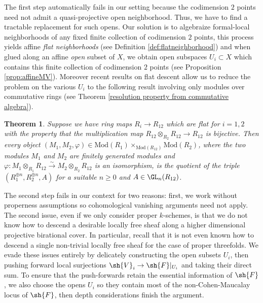 \documentclass[12pt]{amsart}
\newtheorem{maintheorem}{Theorem}
\newcommand{\ra}{\rightarrow}
\begin{document}
The first step automatically fails in our setting because the codimension $2$ points need not admit a quasi-projective open neighborhood. Thus, we have to find a tractable replacement for such opens. Our solution is to algebraize formal-local neighborhoods of any fixed finite collection of codimension $2$ points, this process yields affine \emph{flat neighborhoods} (see Definition \ref{def:flatneighborhood}) and when glued along an affine \emph{open} subset of $X$, we obtain open subspaces $U_i \subset X$ which contains this finite collection of codimension $2$ points (see Proposition \ref{prop:affineMV}). Moreover recent results on flat descent allow us to reduce the problem on the various $U_i$ to the following result involving only modules over commutative rings (see Theorem \ref{resolution property from commutative algebra}). %

\begin{maintheorem}
\label{intro: resolution property from commutative algebra}
Suppose we have ring maps $R_i\ra R_{12}$ which are flat for $i=1,2$ with the property that the multiplication map $R_{12}\otimes_{R_2}R_{12}\ra R_{12}$ is bijective. Then every object $(M_1,M_2,\varphi) \in \mathrm{Mod}(R_1) \times_{\mathrm{Mod}(R_{12})} \mathrm{Mod}(R_2)$, where the two modules $M_1$ and $M_2$ are finitely generated modules and $\varphi:M_1 \otimes_{R_1} R_{12} \xrightarrow{\sim} M_2 \otimes_{R_2} R_{12}$ is an isomorphism, is the quotient of the triple $(R_1^{\oplus n}, R_2^{\oplus n}, A)$ for a suitable $n\geq 0$ and $A\in \GL_n(R_{12})$.
\end{maintheorem} 

The second step fails in our context for two reasons: first, we work without properness assumptions so cohomological vanishing arguments need not apply. The second issue, even if we only consider proper $k$-schemes, is that we do not know how to descend a desirable locally free sheaf along a higher dimensional projective birational cover. In particular, recall that it is not even known how to descend a single non-trivial locally free sheaf for the case of proper threefolds. We evade these issues entirely by delicately constructing the open subsets $U_i$, then pushing forward local surjections $\sh{V}_i \to \sh{F}|_{U_i}$ and taking their direct sum. To ensure that the push-forwards retain the essential information of $\sh{F}$, we also choose the opens $U_i$ so they contain most of the non-Cohen-Maucalay locus of $\sh{F}$, then depth considerations finish the argument.
\end{document}
